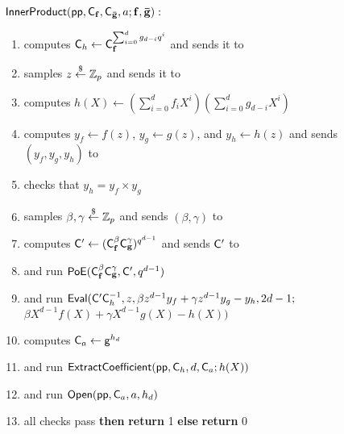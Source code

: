 \documentclass{article}
\theoremstyle{definition}
\begin{document}
\begin{figure}[!htp]
\noindent\begin{mdframed}[userdefinedwidth=\textwidth]
\begin{minipage}{\textwidth}
	\begin{flushleft}
	$\textsf{{InnerProduct}}(\textsf{pp}, \mathsf{C}_\mathbf{f}, \mathsf{C}_\mathbf{\bar{g}}, a; \mathbf{f}, \mathbf{\bar{g}}):$ 
		\begin{enumerate}[nolistsep]
		    \item \prover computes $\mathsf{C}_h \gets \mathsf{C}_\mathbf{f}^{\sum_{i=0}^{d} g_{d-i} q^i}$ and sends it to \verifier
		    \item \verifier samples $z \overset{\$}{\gets} \mathbb{Z}_p$ and sends it to \prover
		    \item \prover computes $h(X) \gets \left(\sum_{i=0}^d f_i X^i\right) \left(\sum_{i=0}^d g_{d-i} X^i\right)$
		    \item \prover computes $y_f \gets f(z)$, $y_g \gets g(z)$, and $y_h \gets h(z)$ and sends $(y_f, y_g, y_h)$ to \verifier
		    \item \verifier checks that $y_h = y_f \times y_g$
		    \item \verifier samples $\beta, \gamma \overset{\$}{\gets} \mathbb{Z}_p$ and sends $(\beta, \gamma)$ to \prover
		    \item \prover computes $\mathsf{C}' \gets (\mathsf{C}_\mathbf{f}^\beta \mathsf{C}_\mathbf{g}^\gamma)^{q^{d-1}}$ and sends $\mathsf{C}'$ to \verifier
		    \item \prover and \verifier run $\textsf{{PoE}}(\mathsf{C}_\mathbf{f}^\beta \mathsf{C}_\mathbf{g}^\gamma, \mathsf{C}', q^{d-1})$
		    \item \prover and \verifier run $\textsf{{Eval}}(\mathsf{C}'\mathsf{C}_h^{-1}, z, {\beta{} z^{d-1} y_f + \gamma{} z^{d-1} y_g - y_h} , {2d-1} ;$ ${\beta{} X^{d-1} f(X) + \gamma{} X^{d-1} g(X) - h(X)})$
		    \item \prover computes $\mathsf{C}_a \leftarrow \mathsf{g}^{h_d}$
		    \item \prover and \verifier run $\textsf{{ExtractCoefficient}}(\textsf{pp}, \mathsf{C}_h, d, \mathsf{C}_a; h(X))$
		    \item \prover and \verifier run $\textsf{{Open}}(\textsf{pp}, \mathsf{C}_a, a, h_d)$
		    \item \pcif{}all checks pass \textbf{then} \textbf{return} 1 \textbf{else} \textbf{return} 0
		\end{enumerate}
	\end{flushleft}
\end{minipage}
\end{mdframed}
\end{figure}
\end{document}
